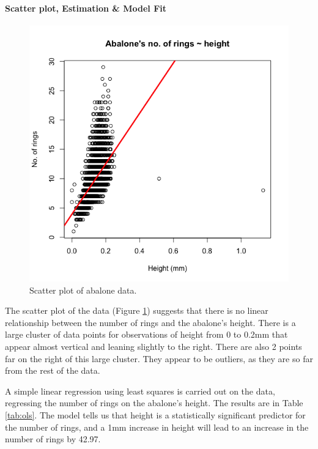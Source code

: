 \documentclass[11pt,letterpaper]{article}
\begin{document}
	\paragraph*{Scatter plot, Estimation \& Model Fit}
	
	\begin{figure}
		\centering
		\includegraphics[height=0.4\textheight]{2-scatterplot}
		\caption{Scatter plot of abalone data.}
		\label{fig:scatterplot}
	\end{figure}

	The scatter plot of the data (Figure \ref{fig:scatterplot}) suggests that there is no linear relationship between the number of rings and the abalone's height. There is a large cluster of data points for observations of height from 0 to 0.2mm that appear almost vertical and leaning slightly to the right. There are also 2 points far on the right of this large cluster. They appear to be outliers, as they are so far from the rest of the data.  
	
	A simple linear regression using least squares is carried out on the data, regressing the number of rings on the abalone's height. The results are in Table \ref{tab:ols}. The model tells us that height is a statistically significant predictor for the number of rings, and a 1mm increase in height will lead to an increase in the number of rings by 42.97. 
	
\end{document}

